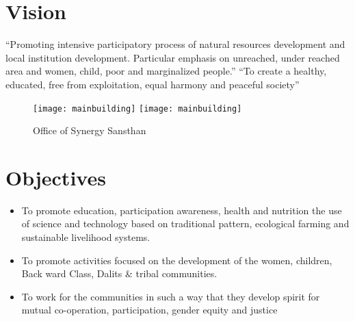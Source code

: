 
\section{Vision}
``Promoting intensive participatory process of natural resources development and local institution development. Particular emphasis on unreached, under reached area and women, child, poor and marginalized people.''
\newline
``To create a healthy, educated, free from exploitation, equal harmony and peaceful society''


\begin{figure}[!htbp]
  \begin{center}
    \leavevmode
    \ifpdf
      \texttt{[image: mainbuilding]}
    \else
      \texttt{[image: mainbuilding]}
    \fi
    \caption{Office of Synergy Sansthan}
    \label{FigAir}
  \end{center}
\end{figure}


\section{Objectives}
\begin{itemize}
	\item To promote education, participation awareness, health and nutrition the use of science and technology based on traditional pattern, ecological farming and sustainable livelihood systems.
	\item To promote activities focused on the development of the women, children, Back ward Class, Dalits \& tribal communities.
	\item To work for the communities in such a way that they develop spirit for mutual co-operation, participation, gender equity and justice
\end{itemize}

